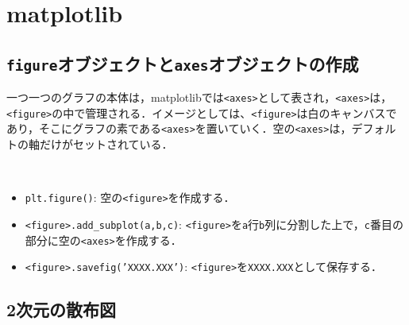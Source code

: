 \section{matplotlib}

\subsection{\texttt{figure}オブジェクトと\texttt{axes}オブジェクトの作成}
一つ一つのグラフの本体は，matplotlibでは\texttt{<axes>}として表され，\texttt{<axes>}は，\texttt{<figure>}の中で管理される．イメージとしては、\texttt{<figure>}は白のキャンバスであり，そこにグラフの素である\texttt{<axes>}を置いていく．空の\texttt{<axes>}は，デフォルトの軸だけがセットされている．

\begin{gram}　
\begin{itemize}
\item \texttt{plt.figure()}: 空の\texttt{<figure>}を作成する．
\item \texttt{<figure>.add\_subplot(a,b,c)}: \texttt{<figure>}を\texttt{a}行\texttt{b}列に分割した上で，\texttt{c}番目の部分に空の\texttt{<axes>}を作成する．
\item \texttt{<figure>.savefig('XXXX.XXX')}: \texttt{<figure>}を\texttt{XXXX.XXX}として保存する．
\end{itemize}
\end{gram}

\begin{cod}[\texttt{fig1.py}]　
}]{code/fig1.py}
\vspace{-19pt}
\begin{figure}[H]
\begin{center}
\framed
\texttt{[image: code/fig1.eps]}
\vspace{-16pt}
\caption{\texttt{fig1.eps}}
\endframed
\end{center}
\end{figure}
\end{cod}
\vspace{-20pt}

\subsection{2次元の散布図}

